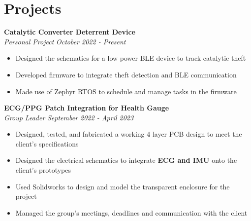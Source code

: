 \documentclass[a4paper,20pt]{article}
\begin{document}
\vspace{-8pt}
\section{Projects}


\vspace{-1pt}
\textbf{Catalytic Converter Deterrent Device} \\
\textit{Personal Project} \hspace{11.85cm}
\textit{October 2022 - Present}
\vspace{-6pt}
\begin{itemize} %
\item Designed the schematics for a low power BLE device to track catalytic theft \vspace{-5pt}
\item Developed firmware to integrate theft detection and BLE communication \vspace{-5pt}
\item Made use of Zephyr RTOS to schedule and manage tasks in the firmware
\end{itemize}

\vspace{-1pt}
\textbf{ECG/PPG Patch Integration for Health Gauge} \\
\textit{Group Leader} \hspace{11.5cm}
\textit{September 2022 - April 2023}
\vspace{-5pt}
\begin{itemize}
\item Designed, tested, and fabricated a working 4 layer PCB design to meet the client's specifications \vspace{-5pt}
\item Designed the electrical schematics to integrate \textbf{ECG and IMU} onto the client's prototypes \vspace{-5pt}
\item Used Solidworks to design and model the transparent enclosure for the project \vspace{-5pt}
\item Managed the group's meetings, deadlines and communication with the client
\end{itemize}
\end{document}
